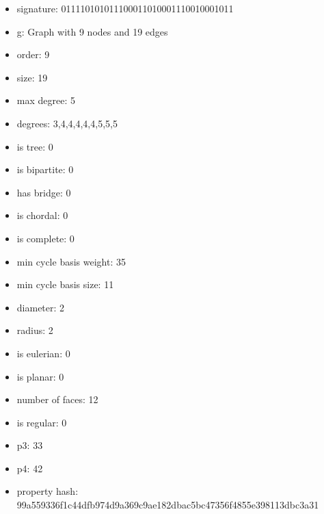 \newpage
\begin{figure}
\end{figure}
\begin{itemize}
\item signature: 011110101011100011010001110010001011
\item g: Graph with 9 nodes and 19 edges
\item order: 9
\item size: 19
\item max degree: 5
\item degrees: 3,4,4,4,4,4,5,5,5
\item is tree: 0
\item is bipartite: 0
\item has bridge: 0
\item is chordal: 0
\item is complete: 0
\item min cycle basis weight: 35
\item min cycle basis size: 11
\item diameter: 2
\item radius: 2
\item is eulerian: 0
\item is planar: 0
\item number of faces: 12
\item is regular: 0
\item p3: 33
\item p4: 42
\item property hash: 99a559336f1c44dfb974d9a369c9ae182dbac5bc47356f4855e398113dbc3a31
\end{itemize}
